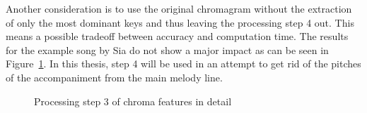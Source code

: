 \begin{figure}[htbp]
	\centering
\end{figure}

\noindent Another consideration is to use the original chromagram without the extraction of only the most dominant keys and thus leaving the processing step 4 out. This means a possible tradeoff between accuracy and computation time. The results for the example song by Sia do not show a major impact as can be seen in Figure~\ref{fig:nomax}. In this thesis, step 4 will be used in an attempt to get rid of the pitches of the accompaniment from the main melody line.
\begin{figure}[htbp]
	\centering
	\caption{Processing step 3 of chroma features in detail}
	\label{fig:nomax}
\end{figure}

